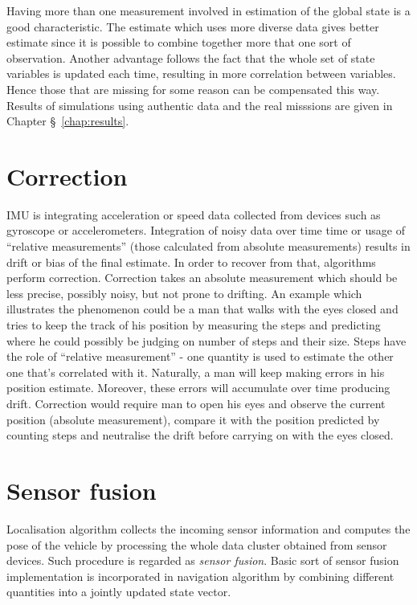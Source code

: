 Having more than one measurement involved in estimation of the global state is a good characteristic. The estimate which uses more diverse data gives better estimate since it is possible to combine together more that one sort of observation. Another advantage follows the fact that the whole set of state variables is updated each time, resulting in more correlation between variables. Hence those that are missing for some reason can be compensated this way. Results of simulations using authentic data and the  real misssions are given in Chapter \S~\ref{chap:results}. 
\section{Correction}
IMU is integrating acceleration or speed data collected from devices such as gyroscope or accelerometers. Integration of noisy data over time time or usage of ``relative measurements'' (those calculated from absolute measurements) results in drift or bias of the final estimate. In order to recover from that, algorithms perform correction. Correction takes an absolute measurement which should be less precise, possibly noisy, but not prone to drifting. An example which illustrates the phenomenon could be a man that walks with the eyes closed and tries to keep the track of his position by measuring the steps and predicting where he could possibly be judging on number of steps and their size. Steps have the role of ``relative measurement'' - one quantity is used to estimate the other one that's correlated with it. Naturally, a man will keep making errors in his position estimate. Moreover, these errors will accumulate over time producing drift. Correction would require man to open his eyes and observe the current position (absolute measurement), compare it with the position predicted by counting steps and neutralise the drift before carrying on with the eyes closed. 
\section{Sensor fusion}
Localisation algorithm collects the incoming sensor information and computes the pose of the vehicle by processing the whole data cluster obtained from sensor devices. Such procedure is regarded as \textit{sensor fusion}. Basic sort of sensor fusion implementation is incorporated in navigation algorithm by combining different quantities into a jointly updated state vector.
